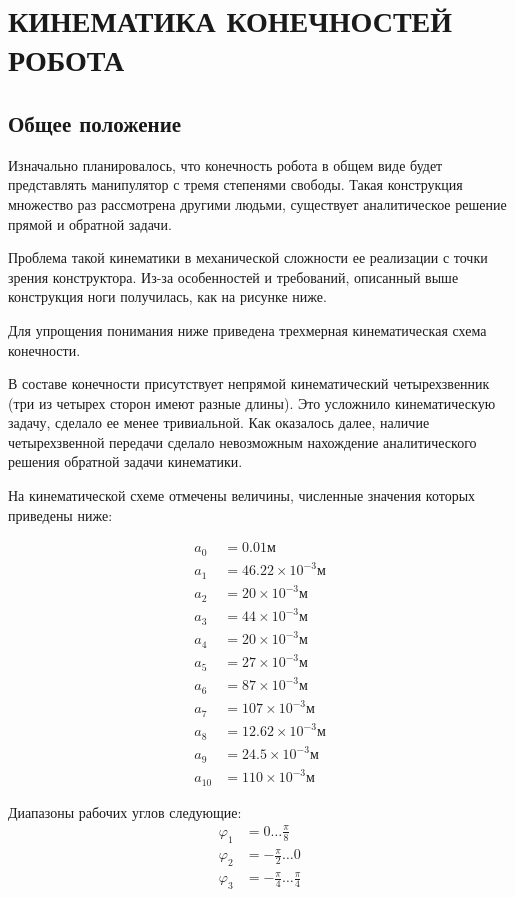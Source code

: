 \chapter{\MakeUppercase{Кинематика конечностей робота}}
\section{Общее положение}
Изначально планировалось, что конечность робота в общем виде будет представлять манипулятор с тремя степенями свободы. Такая конструкция множество раз рассмотрена другими людьми, существует аналитическое решение прямой и обратной задачи.

Проблема такой кинематики в механической сложности ее реализации с точки зрения конструктора. Из-за особенностей и требований, описанный выше \fixme конструкция ноги получилась, как на рисунке ниже.

Для упрощения понимания ниже приведена трехмерная кинематическая схема конечности.

В составе конечности присутствует непрямой кинематический четырехзвенник (три из четырех сторон имеют разные длины). Это усложнило кинематическую задачу, сделало ее менее тривиальной. Как оказалось далее, наличие четырехзвенной передачи сделало невозможным нахождение аналитического решения обратной задачи кинематики.

На кинематической схеме отмечены величины, численные значения которых приведены ниже:

\begin{align*}
    a_0&=0.01 м \\
    a_1&=46.22 \times 10^{-3} м \\
    a_2&=20 \times 10^{-3} м \\
    a_3&=44 \times 10^{-3} м \\
    a_4&=20 \times 10^{-3} м \\
    a_5&=27 \times 10^{-3} м \\
    a_6&=87 \times 10^{-3} м \\
    a_7&=107 \times 10^{-3} м \\
    a_8&=12.62 \times 10^{-3} м \\
    a_9&=24.5 \times 10^{-3} м \\
    a_10&=110 \times 10^{-3} м
\end{align*}

Диапазоны рабочих углов следующие:
\begin{align*}
    \varphi_1&=0 \dots \frac \pi 8 \\
    \varphi_2&=-\frac \pi 2 \dots 0 \\
    \varphi_3&=-\frac \pi 4 \dots \frac \pi 4
\end{align*}


